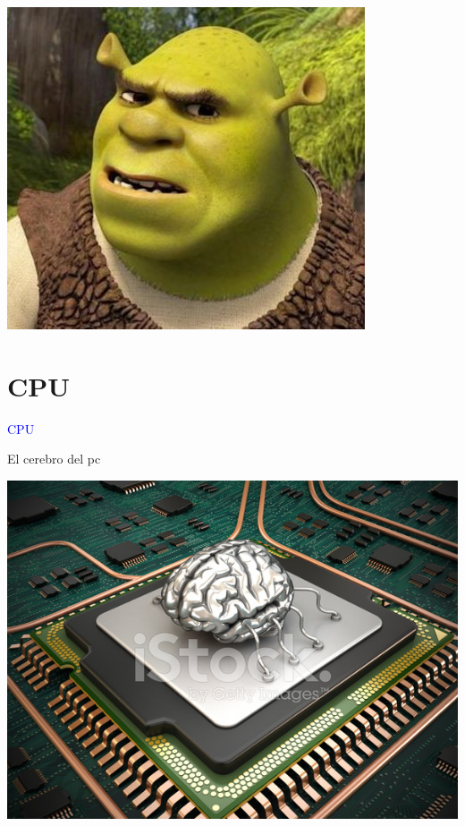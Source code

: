 \documentclass[10pt,xcolor={dvipsnames}]{beamer}
\begin{document}
\begin{frame}
\begin{center}
\includegraphics[scale=0.7]{Figures/Shrek1}
\end{center}
\end{frame}

\section{CPU}
\begin{frame}
\begin{center}
\Huge{\textcolor{blue}{CPU}}
\end{center}
\end{frame}

\begin{frame}{El cerebro del pc}
\begin{center}
\includegraphics[scale=0.4]{Figures/cpuCerebro}
\end{center}
\end{frame}
\end{document}

